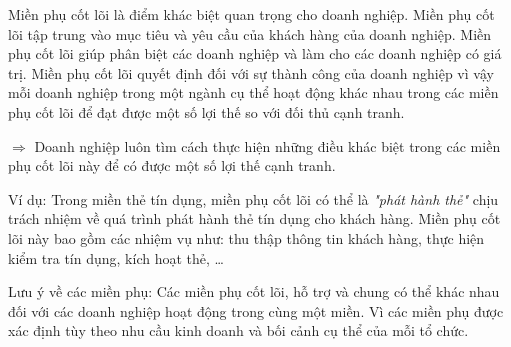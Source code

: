 Miền phụ cốt lõi là điểm khác biệt quan trọng cho doanh nghiệp.
Miền phụ cốt lõi tập trung vào mục tiêu và yêu cầu  của   khách hàng của doanh nghiệp.
Miền phụ cốt lõi  giúp phân biệt các doanh nghiệp và làm cho các doanh nghiệp có giá trị.
Miền phụ cốt lõi    quyết định đối với sự thành công của   doanh nghiệp   vì vậy  mỗi doanh nghiệp trong một ngành cụ thể hoạt động khác nhau trong các miền phụ cốt lõi để đạt được một số lợi thế so với đối thủ cạnh tranh.



$\Rightarrow$ Doanh nghiệp luôn tìm cách thực hiện những điều khác biệt trong các miền phụ cốt lõi này để có được một số lợi thế cạnh tranh.

Ví dụ: Trong miền thẻ tín dụng, miền phụ cốt lõi có thể là \textit{"phát hành thẻ"} chịu trách nhiệm về quá trình phát hành thẻ tín dụng cho khách hàng. Miền phụ cốt lõi này bao gồm các nhiệm vụ như: thu thập thông tin khách hàng, thực hiện kiểm tra tín dụng, kích hoạt thẻ, \dots

Lưu ý về các miền phụ: Các miền phụ   cốt lõi, hỗ trợ và chung  có thể khác nhau     đối với các doanh nghiệp       hoạt động trong cùng một miền. 
Vì các miền phụ  được  xác định tùy  theo nhu cầu kinh doanh và bối cảnh cụ thể của mỗi tổ chức. 




